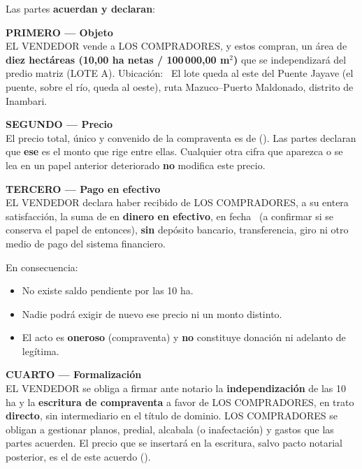 \documentclass[12pt,a4paper]{article}
\begin{document}
\vspace{0.7em}
\noindent Las partes \textbf{acuerdan y declaran}:

\vspace{0.45em}
\noindent\textbf{PRIMERO --- Objeto}\\[0.15em]
EL VENDEDOR vende a LOS COMPRADORES, y estos compran, un área de \textbf{diez hectáreas (10,00 ha netas / 100\,000,00 m$^2$)} que se independizará del predio matriz (LOTE A). Ubicación: \CriterioRecorte\ El lote queda al este del Puente Jayave (el puente, sobre el río, queda al oeste), ruta Mazuco--Puerto Maldonado, distrito de Inambari.

\vspace{0.45em}
\noindent\textbf{SEGUNDO --- Precio}\\[0.15em]
El precio total, único y convenido de la compraventa es de \textbf{\MontoPago} (\textbf{\MontoPagoLetras}). Las partes declaran que \textbf{ese} es el monto que rige entre ellas. Cualquier otra cifra que aparezca o se lea en un papel anterior deteriorado \textbf{no} modifica este precio.

\vspace{0.45em}
\noindent\textbf{TERCERO --- Pago en efectivo}\\[0.15em]
EL VENDEDOR declara haber recibido de LOS COMPRADORES, a su entera satisfacción, la suma de \textbf{\MontoPago} en \textbf{dinero en efectivo}, en fecha \FechaPago\ (a confirmar si se conserva el papel de entonces), \textbf{sin} depósito bancario, transferencia, giro ni otro medio de pago del sistema financiero.

\vspace{0.25em}
\noindent En consecuencia:
\begin{itemize}[leftmargin=1.2cm,itemsep=0.25em]
\item No existe saldo pendiente por las 10 ha.
\item Nadie podrá exigir de nuevo ese precio ni un monto distinto.
\item El acto es \textbf{oneroso} (compraventa) y \textbf{no} constituye donación ni adelanto de legítima.
\end{itemize}

\vspace{0.45em}
\noindent\textbf{CUARTO --- Formalización}\\[0.15em]
EL VENDEDOR se obliga a firmar ante notario la \textbf{independización} de las 10 ha y la \textbf{escritura de compraventa} a favor de LOS COMPRADORES, en trato \textbf{directo}, sin intermediario en el título de dominio. LOS COMPRADORES se obligan a gestionar planos, predial, alcabala (o inafectación) y gastos que las partes acuerden. El precio que se insertará en la escritura, salvo pacto notarial posterior, es el de este acuerdo (\MontoPago).
\end{document}
